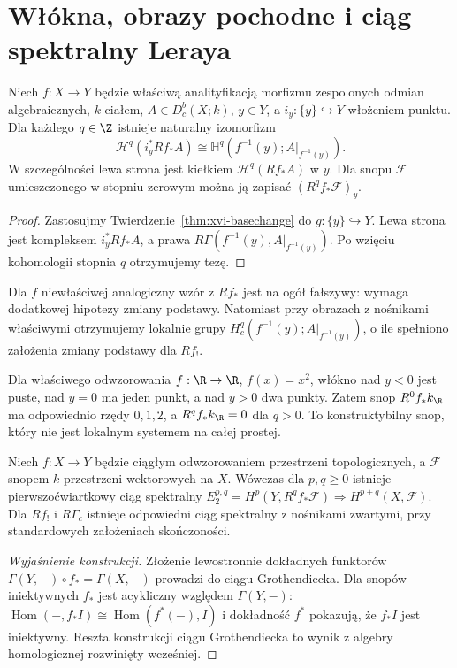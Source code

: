 \section{Włókna, obrazy pochodne i ciąg spektralny Leraya}
\begin{twierdzenie}
Niech $f:X\to Y$ będzie właściwą analityfikacją
morfizmu zespolonych odmian algebraicznych,
$k$ ciałem, $A\in D^b_c(X;k)$, $y\in Y$,
a $i_y:\{y\}\hookrightarrow Y$ włożeniem punktu.
Dla każdego $q\in\Z$ istnieje naturalny izomorfizm
\[
\mathcal H^q(i_y^*Rf_*A)
\cong\mathbb H^q(f^{-1}(y);A|_{f^{-1}(y)}).
\]
W szczególności lewa strona jest kiełkiem
$\mathcal H^q(Rf_*A)$ w $y$. Dla snopu $\mathcal F$
umieszczonego w stopniu zerowym można ją zapisać
$(R^qf_*\mathcal F)_y$.
\end{twierdzenie}
\begin{proof}
Zastosujmy Twierdzenie~\ref{thm:xvi-basechange} do
$g:\{y\}\hookrightarrow Y$. Lewa strona jest
kompleksem $i_y^*Rf_*A$, a prawa
$R\Gamma(f^{-1}(y),A|_{f^{-1}(y)})$.
Po wzięciu kohomologii stopnia $q$ otrzymujemy tezę.
\end{proof}
\begin{uwaga}
Dla $f$ niewłaściwej analogiczny wzór z $Rf_*$ jest na ogół
fałszywy: wymaga dodatkowej hipotezy zmiany podstawy. Natomiast przy obrazach z nośnikami właściwymi
otrzymujemy lokalnie grupy $H_c^q(f^{-1}(y);A|_{f^{-1}(y)})$,
o ile spełniono założenia zmiany podstawy dla $Rf_!$.
\end{uwaga}
\begin{przyklad}
Dla właściwego odwzorowania $f:\R\to\R$, $f(x)=x^2$, włókno
nad $y<0$ jest puste, nad $y=0$ ma jeden punkt, a nad
$y>0$ dwa punkty. Zatem snop $R^0f_*k_\R$ ma
odpowiednio rzędy $0,1,2$, a $R^qf_*k_\R=0$ dla $q>0$.
To konstruktybilny snop, który nie jest lokalnym systemem
na całej prostej.
\end{przyklad}
\begin{twierdzenie}
Niech $f:X\to Y$ będzie ciągłym odwzorowaniem
przestrzeni topologicznych, a $\mathcal F$ snopem
$k$-przestrzeni wektorowych na $X$. Wówczas
dla $p,q\ge0$ istnieje pierwszoćwiartkowy ciąg spektralny
$E_2^{p,q}=H^p(Y,R^qf_*\mathcal F)
\Longrightarrow H^{p+q}(X,\mathcal F)$.
Dla $Rf_!$ i $R\Gamma_c$ istnieje odpowiedni ciąg
spektralny z nośnikami zwartymi, przy standardowych
założeniach skończoności.
\end{twierdzenie}
\begin{proof}[Wyjaśnienie konstrukcji]
Złożenie lewostronnie dokładnych funktorów
$\Gamma(Y,-)\circ f_*=\Gamma(X,-)$ prowadzi do
ciągu Grothendiecka. Dla snopów iniektywnych
$f_*$ jest acykliczny względem $\Gamma(Y,-)$:
$\operatorname{Hom}(-,f_*I)\cong
\operatorname{Hom}(f^*(-),I)$ i dokładność $f^*$
pokazują, że $f_*I$ jest iniektywny.
Reszta konstrukcji ciągu Grothendiecka to wynik
z algebry homologicznej rozwinięty wcześniej.
\end{proof}


